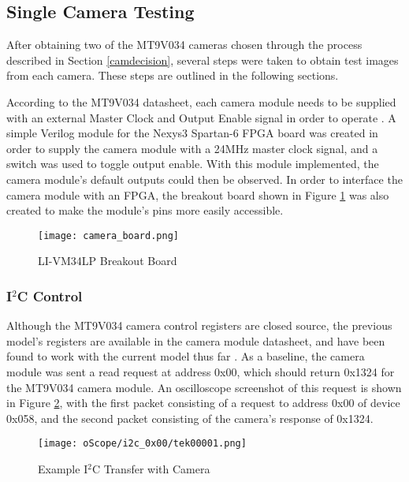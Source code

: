 \subsection{Single Camera Testing}
After obtaining two of the MT9V034 cameras chosen through the process described in Section \ref{camdecision}, several steps were taken to obtain test images from each camera. These steps are outlined in the following sections.
\par
According to the MT9V034 datasheet, each camera module needs to be supplied with an external Master Clock and Output Enable signal in order to operate \cite{mt9v034}. A simple Verilog module for the Nexys3 Spartan-6 FPGA board was created in order to supply the camera module with a 24MHz master clock signal, and a switch was used to toggle output enable. With this module implemented, the camera module's default outputs could then be observed. In order to interface the camera module with an FPGA, the breakout board shown in Figure \ref{camBreakoutBoard} was also created to make the module's pins more easily accessible. 

\begin{figure}[H]
	\centerline{\texttt{[image: camera\_board.png]}}
	\caption{LI-VM34LP Breakout Board}
	\label{camBreakoutBoard}
\end{figure}

\subsubsection{I$^2$C Control} 
Although the MT9V034 camera control registers are closed source, the previous model's registers are available in the camera module datasheet, and have been found to work with the current model thus far \cite{mt9v032}. As a baseline, the camera module was sent a read request at address 0x00, which should return 0x1324 for the MT9V034 camera module. An oscilloscope screenshot of this request is shown in Figure \ref{camVersion}, with the first packet consisting of a request to address 0x00 of device 0x058, and the second packet consisting of the camera's response of 0x1324. 
\begin{figure}[H]
	\centerline{\texttt{[image: oScope/i2c\_0x00/tek00001.png]}}
	\caption{Example I$^2$C Transfer with Camera}
	\label{camVersion}
\end{figure}

